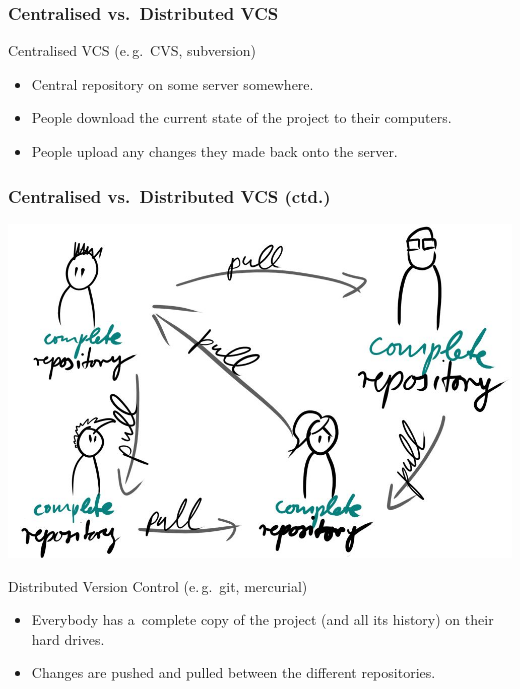 \documentclass[12pt]{beamer}
\begin{document}
\begin{frame}
  \frametitle{Centralised vs.\ Distributed VCS }

    \begin{block}{Centralised VCS (e.\,g.\ CVS, subversion)}
      \begin{itemize}
        \item Central repository on some server somewhere.
        \item People download the current state of the project to their computers.
        \item People upload any changes they made back onto the server.
      \end{itemize}
    \end{block}
\end{frame}

\begin{frame}
  \frametitle{Centralised vs.\ Distributed VCS (ctd.)}

  \begin{center}
    \includegraphics[width=.5\textwidth]{images/distributed-vcs.jpg}%
  \end{center}
  \begin{block}{Distributed Version Control (e.\,g.\ git, mercurial)}
    \begin{itemize}
      \item Everybody has a~complete copy of the project (and all its history)
        on their hard drives.
      \item Changes are pushed and pulled between the different repositories.
    \end{itemize}
  \end{block}
\end{frame}
\end{document}
